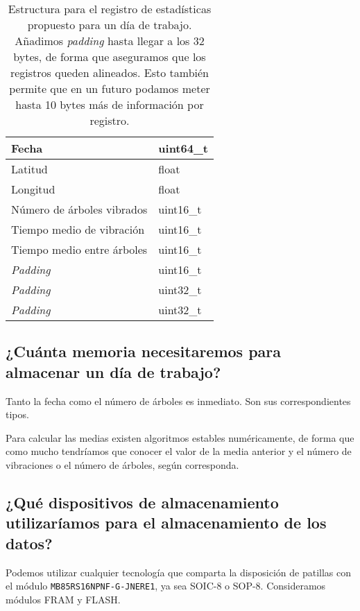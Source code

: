 \begin{table}[H]
    \centering
    \begin{tabular}{|l|l|}
        \hline
        Fecha                        & uint64\_t \\ \hline
        Latitud                      & float \\ \hline
        Longitud                     & float \\ \hline
        Número de árboles vibrados   & uint16\_t \\ \hline
        Tiempo medio de vibración    & uint16\_t \\ \hline
        Tiempo medio entre árboles   & uint16\_t \\ \hline
        \textit{Padding}             & uint16\_t \\ \hline
        \textit{Padding}             & uint32\_t \\ \hline
        \textit{Padding}             & uint32\_t \\ \hline
    \end{tabular}
    \caption{Estructura para el registro de estadísticas propuesto para un día de trabajo.
    Añadimos \textit{padding} hasta llegar a los 32 bytes, de forma que aseguramos que los
    registros queden alineados. Esto también permite que en un futuro
    podamos meter hasta 10 bytes más de información por registro.}
    \label{table:almacenamiento}
\end{table}

\subsection{¿Cuánta memoria necesitaremos para almacenar un día de trabajo?}

Tanto la fecha como el número de árboles es inmediato. Son sus correspondientes tipos.

Para calcular las medias existen algoritmos estables numéricamente, de forma que como mucho
tendríamos que conocer el valor de la media anterior y el número de vibraciones o el número
de árboles, según corresponda.

\subsection{¿Qué dispositivos de almacenamiento utilizaríamos para el almacenamiento de los datos?}

Podemos utilizar cualquier tecnología que comparta la disposición de patillas con el módulo \linebreak \texttt{MB85RS16NPNF-G-JNERE1},
ya sea SOIC-8 o SOP-8. Consideramos módulos FRAM y FLASH.

